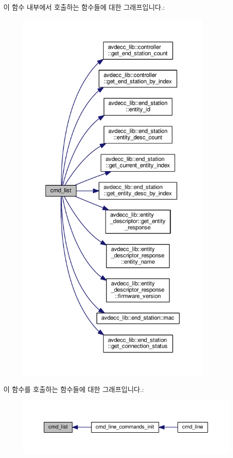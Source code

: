 이 함수 내부에서 호출하는 함수들에 대한 그래프입니다.\+:
\nopagebreak
\begin{figure}[H]
\begin{center}
\leavevmode
\includegraphics[height=550pt]{classcmd__line_a311620e4b2cb2f4f6cab8a372aa3d5f2_cgraph}
\end{center}
\end{figure}




이 함수를 호출하는 함수들에 대한 그래프입니다.\+:
\nopagebreak
\begin{figure}[H]
\begin{center}
\leavevmode
\includegraphics[width=350pt]{classcmd__line_a311620e4b2cb2f4f6cab8a372aa3d5f2_icgraph}
\end{center}
\end{figure}


